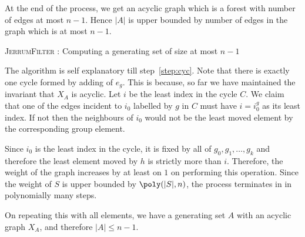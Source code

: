 At the end of the process, we get an acyclic graph which is a forest with
number of edges at most $n-1$. Hence $|A|$ is upper bounded by number of
edges in the graph which is at most $n-1$.

\begin{algorithm}[htp!]
\caption{\textsc{JerrumFilter} : Computing a generating set of size at most
$n-1$}
\label{alg:jerfilter}
\begin{algorithmic}[1] 
		 \label{step:cyc}
		\EndIf
	\EndFor
\EndProcedure
\end{algorithmic}
\end{algorithm}

The algorithm is self explanatory till step~\ref{step:cyc}. Note that there is
exactly one cycle formed by adding of $e_g$. This is because, so far we have
maintained the invariant that $X_A$ is acyclic.
Let $i$ be the least index in the cycle $C$. We claim that
one of the edges incident to $i_0$ labelled by $g$ in $C$ must have $i =
i_0^g$ as its least index.  If not then the
neighbours of $i_0$ would not be the least moved element by the corresponding
group element.

Since $i_0$ is the least index in the cycle, it is fixed by all of 
$g_0, g_1,\ldots, g_k$ and therefore the least element moved by $h$ is
strictly more than $i$. Therefore, the weight of the graph increases by at
least on $1$ on performing this operation. 
Since the weight of $S$ is upper bounded by $\poly(|S|,n)$, the process 
terminates in in polynomially many steps. 
	
On repeating this with all elements, we have a generating set $A$ with an
acyclic graph $X_{A}$, and therefore $|A|\leq n-1$.

